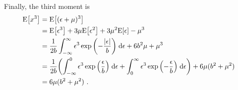Finally, the third moment is
\begin{align}
    \text{E}{\left[x^3\right]}
    &= \text{E}{\left[(\epsilon+\mu)^3\right]}\nonumber\\
    &= \text{E}{\left[\epsilon^3\right]} + 3\mu\text{E}{\left[\epsilon^2\right]} + 3\mu^2\text{E}{\left[\epsilon\right]} - \mu^3\nonumber\\
    &= \frac{1}{2b}\int_{-\infty}^{\infty} \epsilon^3 \exp{\left(-\frac{{\left\lvert\epsilon\right\rvert}}{b}\right)}\;\text{d}\epsilon + 6b^2\mu + \mu^3\nonumber\\
    &= \frac{1}{2b}{\left(\int_{-\infty}^{0} \epsilon^3 \exp{\left(\frac{\epsilon}{b}\right)}\;\text{d}\epsilon + \int_{0}^{\infty} \epsilon^3 \exp{\left(-\frac{\epsilon}{b}\right)}\;\text{d}\epsilon\right)} + 6\mu(b^2 + \mu^2)\nonumber\\
    &= 6\mu(b^2 + \mu^2) \ .
\end{align}

